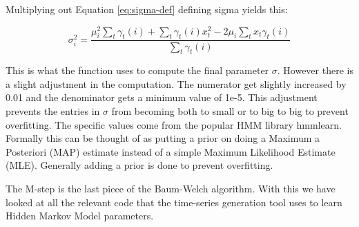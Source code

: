 Multiplying out Equation \eqref{eq:sigma-def} defining sigma yields this: 

\begin{equation}
   \sigma_i^2 = \frac{\mu_i^2 \sum_t \gamma_t(i) + \sum_t \gamma_t(i)x_t^2 - 2 \mu_i \sum_t x_t \gamma_t(i)}{\sum_t \gamma_t(i)}
\end{equation}

This is what the function uses to compute the final parameter $\sigma$. However there is a slight adjustment in the computation. The numerator get slightly increased by 0.01 and the denominator gets a minimum value of 1e-5. This adjustment prevents the entries in $\sigma$ from becoming both to small or to big to big to prevent overfitting. The specific values come from the popular HMM library hmmlearn. \parencite{weiss2019hmmlearn} Formally this can be thought of as putting a prior on doing a Maximum a Posteriori (MAP) estimate instead of a simple Maximum Likelihood Estimate (MLE). Generally adding a prior is done to prevent overfitting. \parencite{gauvain1994maximum}

The M-step is the last piece of the Baum-Welch algorithm. With this we have looked at all the relevant code that the time-series generation tool uses to learn Hidden Markov Model parameters. 